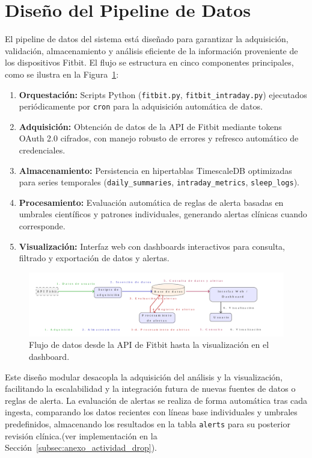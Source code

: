 \section{Diseño del Pipeline de Datos}
\label{sec:diseno_pipeline}

El pipeline de datos del sistema está diseñado para garantizar la adquisición, validación, almacenamiento y análisis eficiente de la información proveniente de los dispositivos Fitbit. El flujo se estructura en cinco componentes principales, como se ilustra en la Figura~\ref{fig:flujo_datos}:

\begin{enumerate}
    \item \textbf{Orquestación:} Scripts Python (\texttt{fitbit.py}, \texttt{fitbit\_intraday.py}) ejecutados periódicamente por \texttt{cron} para la adquisición automática de datos.
    \item \textbf{Adquisición:} Obtención de datos de la API de Fitbit mediante tokens OAuth 2.0 cifrados, con manejo robusto de errores y refresco automático de credenciales.
    \item \textbf{Almacenamiento:} Persistencia en hipertablas TimescaleDB optimizadas para series temporales (\texttt{daily\_summaries}, \texttt{intraday\_metrics}, \texttt{sleep\_logs}).
    \item \textbf{Procesamiento:} Evaluación automática de reglas de alerta basadas en umbrales científicos y patrones individuales, generando alertas clínicas cuando corresponde.
    \item \textbf{Visualización:} Interfaz web con dashboards interactivos para consulta, filtrado y exportación de datos y alertas.
\end{enumerate}

\begin{figure}[htbp]
    \centering
    \includegraphics[width=1\textwidth, height=0.3\textheight]{imagenes/flujo_datos.png}
    \caption{Flujo de datos desde la API de Fitbit hasta la visualización en el dashboard.}
    \label{fig:flujo_datos}
\end{figure}

Este diseño modular desacopla la adquisición del análisis y la visualización, facilitando la escalabilidad y la integración futura de nuevas fuentes de datos o reglas de alerta. La evaluación de alertas se realiza de forma automática tras cada ingesta, comparando los datos recientes con líneas base individuales y umbrales predefinidos, almacenando los resultados en la tabla \texttt{alerts} para su posterior revisión clínica.(ver implementación en la Sección~\ref{subsec:anexo_actividad_drop}).

